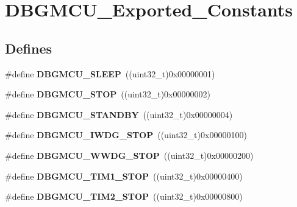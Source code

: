 \hypertarget{group__DBGMCU__Exported__Constants}{
\section{DBGMCU\_\-Exported\_\-Constants}
\label{group__DBGMCU__Exported__Constants}
}
\subsection*{Defines}
\begin{DoxyCompactItemize}
\item 
\hypertarget{group__DBGMCU__Exported__Constants_ga1c457289646b9d9814b93fbb994c9930}{
\#define {\bfseries DBGMCU\_\-SLEEP}~((uint32\_\-t)0x00000001)}
\label{group__DBGMCU__Exported__Constants_ga1c457289646b9d9814b93fbb994c9930}

\item 
\hypertarget{group__DBGMCU__Exported__Constants_ga4a71bcfa6868672674b5410d2fd372f4}{
\#define {\bfseries DBGMCU\_\-STOP}~((uint32\_\-t)0x00000002)}
\label{group__DBGMCU__Exported__Constants_ga4a71bcfa6868672674b5410d2fd372f4}

\item 
\hypertarget{group__DBGMCU__Exported__Constants_ga6eb848845f9207ffdccd0590da192002}{
\#define {\bfseries DBGMCU\_\-STANDBY}~((uint32\_\-t)0x00000004)}
\label{group__DBGMCU__Exported__Constants_ga6eb848845f9207ffdccd0590da192002}

\item 
\hypertarget{group__DBGMCU__Exported__Constants_ga5b8b38b5589a2e26a57325553b5dfe23}{
\#define {\bfseries DBGMCU\_\-IWDG\_\-STOP}~((uint32\_\-t)0x00000100)}
\label{group__DBGMCU__Exported__Constants_ga5b8b38b5589a2e26a57325553b5dfe23}

\item 
\hypertarget{group__DBGMCU__Exported__Constants_ga9ecfb95a943e2ad165395fff4fa12770}{
\#define {\bfseries DBGMCU\_\-WWDG\_\-STOP}~((uint32\_\-t)0x00000200)}
\label{group__DBGMCU__Exported__Constants_ga9ecfb95a943e2ad165395fff4fa12770}

\item 
\hypertarget{group__DBGMCU__Exported__Constants_ga017fb3101a3569426e82b066cb2f8848}{
\#define {\bfseries DBGMCU\_\-TIM1\_\-STOP}~((uint32\_\-t)0x00000400)}
\label{group__DBGMCU__Exported__Constants_ga017fb3101a3569426e82b066cb2f8848}

\item 
\hypertarget{group__DBGMCU__Exported__Constants_ga8ba3a77260f748793c903468a4608bd1}{
\#define {\bfseries DBGMCU\_\-TIM2\_\-STOP}~((uint32\_\-t)0x00000800)}
\label{group__DBGMCU__Exported__Constants_ga8ba3a77260f748793c903468a4608bd1}


\end{DoxyCompactItemize}
